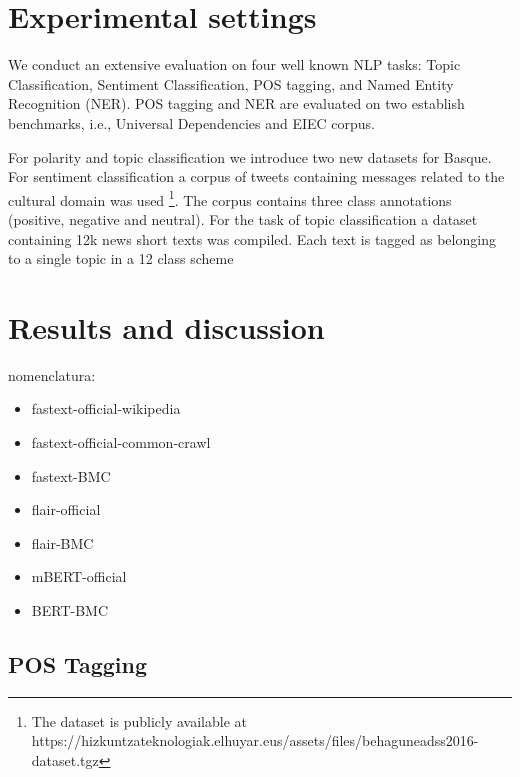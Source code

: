 \documentclass[10pt, a4paper]{article}
\begin{document}
\section{Experimental settings}\label{sec:exper-sett}

We conduct an extensive evaluation on four well known NLP tasks: Topic Classification, Sentiment Classification, POS tagging, and Named Entity Recognition (NER). POS tagging and NER are evaluated on two establish benchmarks, i.e., Universal Dependencies and EIEC corpus. 

For polarity and topic classification we introduce two new datasets for Basque. For sentiment classification a corpus of tweets containing messages related to the cultural domain was used \cite{san2019multilingual}\footnote{The dataset is publicly available at https://hizkuntzateknologiak.elhuyar.eus/assets/files/behaguneadss2016-dataset.tgz}. The corpus contains three class annotations (positive, negative and neutral). For the task of topic classification a dataset containing 12k news short texts was compiled. Each text is tagged as belonging to a single topic in a 12 class scheme



\section{Results and discussion}\label{sec:results-discussion}

nomenclatura: \begin{itemize}
    \item fastext-official-wikipedia 
    \item fastext-official-common-crawl 
    \item fastext-BMC
    \item flair-official
    \item flair-BMC
    \item mBERT-official
    \item BERT-BMC
\end{itemize}




\subsection{POS Tagging}\label{sec:pos-tagging}
\end{document}
